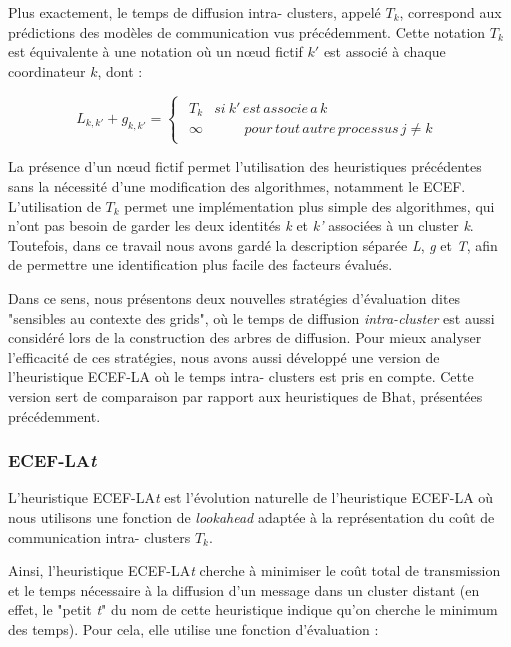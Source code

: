 Plus exactement, le temps de diffusion intra- clusters, appelé $T_{k}$,
correspond aux prédictions des modèles de communication vus précédemment. 
Cette notation $T_{k}$ est équivalente à une notation où un n{\oe}ud
fictif $k'$ est associé à chaque coordinateur $k$, dont :

\[
L_{k,k'}+g_{k,k'}=\left\{ \begin{array}{c}
\begin{array}{cc}
T_{k} & si\: k'\, est\, associe\, a\, k\\
\infty & \,\,\,\,\,\,\,\,\,\,\,\,\, pour\, tout\, autre\, processus\, j\neq k\end{array}\end{array}\right.\]


La présence d'un n{\oe}ud fictif permet l'utilisation des heuristiques
précédentes sans la nécessité d'une modification des algorithmes,
notamment le ECEF. L'utilisation de $T_{k}$ permet une implémentation
plus simple des algorithmes, qui n'ont pas besoin de garder les deux
identités \emph{k} et \emph{k'} associées à un  cluster \emph{k}. Toutefois, dans ce travail nous avons gardé
la description séparée \emph{L}, \emph{g} et \emph{T}, afin
de permettre une identification plus facile des facteurs évalués.

Dans ce sens, nous présentons deux nouvelles stratégies d'évaluation
dites "sensibles au contexte des grids", où
le temps de diffusion \emph{intra-cluster} est aussi considéré lors
de la construction des arbres de diffusion. Pour mieux analyser l'efficacité
de ces stratégies, nous avons aussi développé une version de l'heuristique
ECEF-LA où le temps intra- clusters est pris en compte. Cette version
sert de comparaison par rapport aux heuristiques de Bhat, présentées
précédemment. 


\subsubsection*{ECEF-LA\emph{t}}

L'heuristique ECEF-LA\emph{t} est l'évolution naturelle de l'heuristique
ECEF-LA où nous utilisons une fonction de \emph{lookahead} adaptée
à la représentation du coût de communication intra- clusters $T_{k}$. 

Ainsi, l'heuristique ECEF-LA\emph{t} cherche à minimiser le coût total
de transmission et le temps nécessaire à la diffusion d'un message
dans un  cluster distant (en effet, le "petit \emph{t}"
du nom de cette heuristique indique qu'on cherche le minimum des temps).
Pour cela, elle utilise une fonction d'évaluation :

